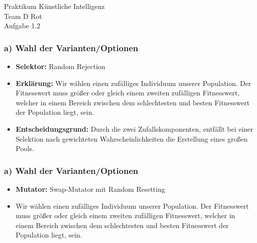 \documentclass{beamer}
\begin{document}
\begin{frame}
  \begin{center}
    \Huge{Praktikum K\"unstliche Intelligenz} \\
    \vspace{1.5cm}
    \huge{Team D Rot} \\
    \vspace{1.5cm}
    \Large{Aufgabe 1.2}
  \end{center}
\end{frame}

\begin{frame}
  \frametitle{\textbf{a)} Wahl der Varianten/Optionen}
  \begin{itemize}
    \item \textbf{Selektor:} Random Rejection
    \item \textbf{Erklärung:} Wir wählen einen zufälliges Individuum unserer Population. Der Fitnesswert 		muss größer oder gleich  einem zweiten zufälligen Fitnesswert, welcher in einem Bereich zwischen dem 		schlechtesten und besten Fitnesswert der Population liegt, sein. 
   \item \textbf{Entscheidungsgrund:} Durch die zwei Zufallskomponenten, entfällt bei einer Selektion 			nach gewichteten Wahrscheinlichkeiten die Erstellung eines großen Pools.
   
  \end{itemize}
\end{frame}

\begin{frame}
  \frametitle{\textbf{a)} Wahl der Varianten/Optionen}
  \begin{itemize}
    \item \textbf{Mutator:} Swap-Mutator mit Random Resetting
    \item Wir wählen einen zufälliges Individuum unserer Population. Der Fitnesswert muss größer oder gleich  einem zweiten zufälligen Fitnesswert, welcher in einem Bereich zwischen dem schlechtesten und besten Fitnesswert der Population liegt, sein. 
   
   
  \end{itemize}
\end{frame}
\end{document}
